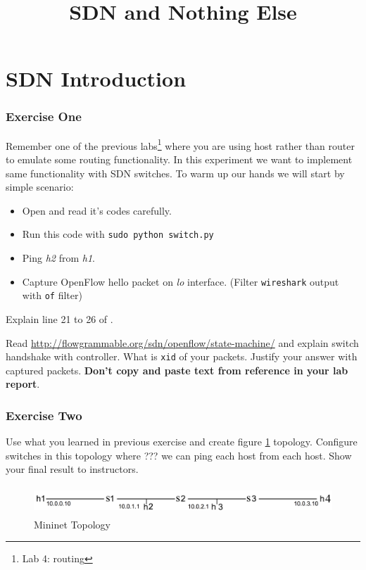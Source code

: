 \documentclass{../UTNetLab}
\title{SDN and Nothing Else}
\begin{document}
\part{SDN Introduction}
    \section{Exercise One}
    Remember one of the previous labs\footnote{Lab 4: routing} where you are using host rather than router to emulate some routing functionality. In this experiment we want to implement same functionality with SDN switches. To warm up our hands we will start by simple scenario:

    \begin{itemize}
        \item Open  and read it's codes carefully.
        \item Run this code with \lstinline{sudo python switch.py}
        \item Ping \textit{h2} from \textit{h1}.
        \item Capture OpenFlow hello packet on \textit{lo} interface. (Filter \lstinline{wireshark} output with \lstinline{of} filter)
    \end{itemize}

    \begin{report}
    \item Explain line 21 to 26 of .
    \item Read \url{http://flowgrammable.org/sdn/openflow/state-machine/} and explain switch handshake with controller. What is \texttt{xid} of your packets. Justify your answer with captured packets. \textbf{Don't copy and paste text from reference in your lab report}.
    \end{report}

    \section{Exercise Two}
    Use what you learned in previous exercise and create figure \ref{fig:linearRouters} topology. Configure switches in this topology where ??? we can ping each host from each host. Show your final result to instructors.

    \begin{figure}[H]
        \centering
        \includegraphics[height=30pt]{img/fig1.png}
        \caption{Mininet Topology}
        \label{fig:linearRouters}
    \end{figure}
\end{document}
